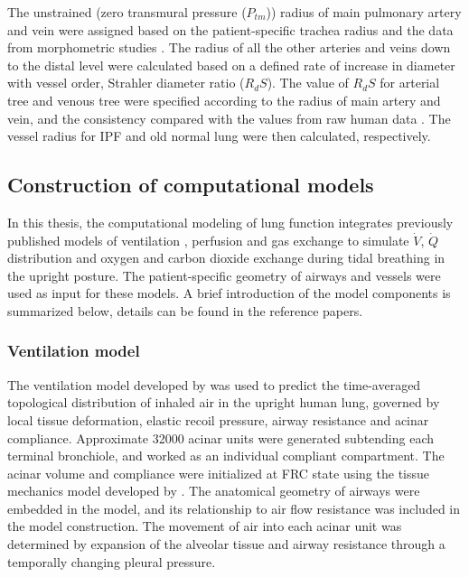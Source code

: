 The unstrained (zero transmural pressure ($P_{tm}$)) radius of main pulmonary artery and vein were assigned based on the patient-specific trachea radius and the data from morphometric studies \citep{horsfield1978morphometry,horsfield1981morphometry,huang1996morphometry}. The radius of all the other arteries and veins down to the distal level were calculated based on a defined rate of increase in diameter with vessel order, Strahler diameter ratio ($R_dS$). The value of $R_dS$ for arterial tree and venous tree were specified according to the radius of main artery and vein, and the consistency compared with the values from raw human data \citep{horsfield1978morphometry,horsfield1981morphometry,huang1996morphometry}. The vessel radius for IPF and old normal lung were then calculated, respectively. 
 
\subsection{Construction of computational models} \label{ComputationalModelConstruction}
In this thesis, the computational modeling of lung function integrates previously published models of ventilation \citep{swan2012computational}, perfusion \citep{clark2010contribution, clark2011interdependent} and gas exchange \citep{swan2010evidence} to simulate $\dot{V}$, $\dot{Q}$ distribution and oxygen and carbon dioxide exchange during tidal breathing in the upright posture. The patient-specific geometry of airways and vessels were used as input for these models. A brief introduction of the model components is summarized below, details can be found in the reference papers.

\subsubsection{Ventilation model}
The ventilation model developed by \cite{swan2012computational} was used to predict the time-averaged topological distribution of inhaled air in the upright human lung, governed by local tissue deformation, elastic recoil pressure, airway resistance and acinar compliance. Approximate 32000 acinar units were generated subtending each terminal bronchiole, and worked as an individual compliant compartment. The acinar volume and compliance were initialized at FRC state using the tissue mechanics model developed by \cite{tawhai2009supine}. The anatomical geometry of airways were embedded in the model, and its relationship to air flow resistance was included in the model construction. The movement of air into each acinar unit was determined by expansion of the alveolar tissue and airway resistance through a temporally changing pleural pressure.

